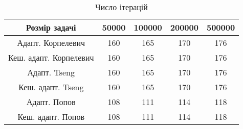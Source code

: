 \begin{table}[H]
	\centering
	\begin{tabular}{|c||c|c|c|c|}\hline
		Розмір задачі & 50000 & 100000 & 200000 & 500000 \\ \hline \hline
		Адапт. Корпелевич & 160 & 165 & 170 & 176 \\ \hline
		Кеш. адапт. Корпелевич & 160 & 165 & 170 & 176 \\ \hline
		Адапт. Tseng & 160 & 165 & 170 & 176 \\ \hline
		Кеш. адапт. Tseng & 160 & 165 & 170 & 176 \\ \hline
		Адапт. Попов & 108 & 111 & 114 & 118 \\ \hline
		Кеш. адапт. Попов & 108 & 111 & 114 & 118 \\ \hline
	\end{tabular}
	\caption{Число ітерацій}
\end{table}
